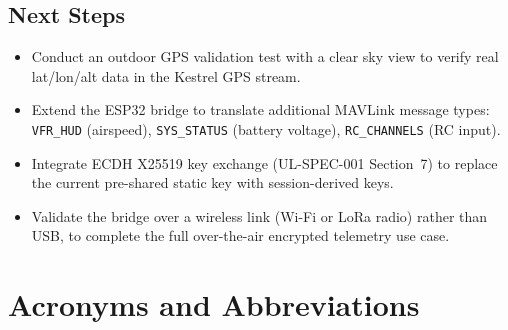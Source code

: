 \documentclass[11pt,a4paper]{article}
\begin{document}
\subsection*{Next Steps}

\begin{itemize}[noitemsep]
    \item Conduct an outdoor GPS validation test with a clear sky view to
          verify real lat/lon/alt data in the Kestrel GPS stream.
    \item Extend the ESP32 bridge to translate additional MAVLink message
          types: \texttt{VFR\_HUD} (airspeed), \texttt{SYS\_STATUS}
          (battery voltage), \texttt{RC\_CHANNELS} (RC input).
    \item Integrate ECDH X25519 key exchange (UL-SPEC-001 Section~7) to
          replace the current pre-shared static key with session-derived keys.
    \item Validate the bridge over a wireless link (Wi-Fi or LoRa radio)
          rather than USB, to complete the full over-the-air encrypted
          telemetry use case.
\end{itemize}

\newpage

\appendix
\section{Acronyms and Abbreviations}
\end{document}
